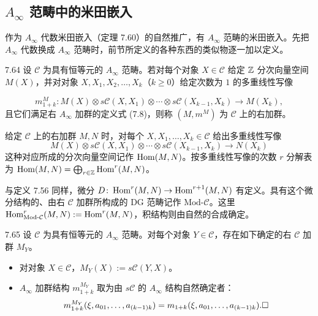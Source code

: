 \subsection{$A_\infty$ 范畴中的米田嵌入}

作为 $A_\infty$ 代数米田嵌入（定理 7.60）的自然推广，有 $A_\infty$ 范畴的米田嵌入。先把 $A_\infty$ 代数换成 $A_\infty$ 范畴时，前节所定义的各种东西的类似物逐一加以定义。

\begin{definition}{7.64}
设 $\mathcal C$ 为具有恒等元的 $A_\infty$ 范畴。若对每个对象 $X\in\mathcal C$ 给定 $\mathbb{Z}$ 分次向量空间 $M(X)$，并对对象 $X,X_{1},X_{2},\dots,X_{k}$（$k\ge 0$）给定次数为 $1$ 的多重线性写像

\[
  m_{1+k}^{M}\colon M(X)\otimes s\mathcal C(X,X_{1})\otimes\cdots\otimes s\mathcal C(X_{k-1},X_{k})\longrightarrow M(X_{k}),
\]
且它们满足右 $A_\infty$ 加群的定义式 (7.8)，则称 $(M,m^{M})$ 为 $\mathcal C$ 上的右加群。
\end{definition}

给定 $\mathcal C$ 上的右加群 $M,N$ 时，对每个 $X,X_{1},\dots,X_{k}\in\mathcal C$ 给出多重线性写像
\[
  M(X)\otimes s\mathcal C(X,X_{1})\otimes\cdots\otimes s\mathcal C(X_{k-1},X_{k})\longrightarrow N(X_{k})
\]
这种对应所成的分次向量空间记作 $\operatorname{Hom}(M,N)$。按多重线性写像的次数 $r$ 分解表为 $\operatorname{Hom}(M,N)=\bigoplus_{r\in\mathbb{Z}}\operatorname{Hom}^{r}(M,N)$。

与定义 7.56 同样，微分 $D\colon\operatorname{Hom}^{r}(M,N)\to\operatorname{Hom}^{r+1}(M,N)$ 有定义。具有这个微分结构的、由右 $\mathcal C$ 加群所构成的 DG 范畴记作 $\mathrm{Mod}\text{-}\mathcal C$。这里 $\operatorname{Hom}_{\mathrm{Mod}\text{-}\mathcal C}^{r}(M,N):=\operatorname{Hom}^{r}(M,N)$，积结构则由自然的合成确定。

\begin{proposition}{7.65}
设 $\mathcal C$ 为具有恒等元的 $A_\infty$ 范畴。对每个对象 $Y\in\mathcal C$，存在如下确定的右 $\mathcal C$ 加群 $M_{Y}$。
\begin{itemize}[leftmargin=1.6em,itemsep=1pt,topsep=1pt]
  \item 对对象 $X\in\mathcal C$，$M_{Y}(X):=s\mathcal C(Y,X)$。
  \item $A_\infty$ 加群结构 $m_{1+k}^{M_{Y}}$ 取为由 $s\mathcal C$ 的 $A_\infty$ 结构自然确定者：
  \[
    m_{1+k}^{M_{Y}}(\xi,a_{01},\dots,a_{(k-1)k})=m_{1+k}(\xi,a_{01},\dots,a_{(k-1)k}).\hfill\square
  \]
\end{itemize}
\end{proposition}

